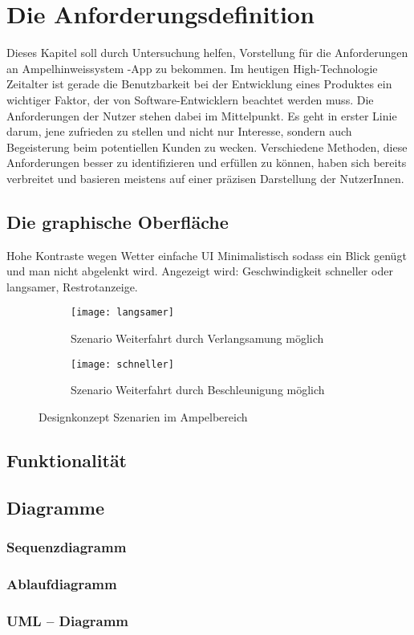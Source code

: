 \chapter{Die Anforderungsdefinition}
Dieses Kapitel soll durch Untersuchung helfen, Vorstellung für die Anforderungen an Ampelhinweissystem -App zu bekommen. 
Im heutigen High-Technologie Zeitalter ist gerade die Benutzbarkeit bei der Entwicklung eines Produktes ein wichtiger Faktor, der von Software-Entwicklern beachtet werden muss. Die Anforderungen der Nutzer stehen dabei im Mittelpunkt. Es geht in erster Linie darum, jene zufrieden zu stellen und nicht nur Interesse, sondern auch Begeisterung beim potentiellen Kunden zu wecken. Verschiedene Methoden, diese Anforderungen besser zu identifizieren und erfüllen zu können, haben sich bereits verbreitet und basieren meistens auf einer präzisen Darstellung der NutzerInnen.
\section{Die graphische Oberfläche}

Hohe Kontraste wegen Wetter
einfache UI 
Minimalistisch sodass ein Blick genügt und man nicht abgelenkt wird.
Angezeigt wird: Geschwindigkeit schneller oder langsamer, 
Restrotanzeige.
\begin{figure}[H]
        \centering
        \begin{subfigure}[b]{0.40\textwidth}
                \texttt{[image: langsamer]}
                \caption[Szenario Gbla]{Szenario Weiterfahrt durch Verlangsamung möglich}
                \label{fig:langsamer}
        \end{subfigure}%
        \hfill %
        \begin{subfigure}[b]{0.40\textwidth}
                \texttt{[image: schneller]}
                \caption[Szenario Gbla]{Szenario Weiterfahrt durch Beschleunigung möglich}
                \label{fig:schneller}
        \end{subfigure}
        \caption[Szenarien im Ampelbereich]{Designkonzept Szenarien im Ampelbereich}
        \label{fig:szenario_mockup}
\end{figure} 

\section{Funktionalität} 
\section{Diagramme}
\subsection*{Sequenzdiagramm}
\subsection*{Ablaufdiagramm}
\subsection*{UML -- Diagramm}
